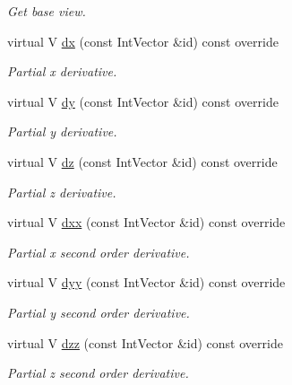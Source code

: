 \begin{DoxyCompactItemize}
\begin{DoxyCompactList}\small\item\em Get base view. \end{DoxyCompactList}\item 
virtual V \hyperlink{classUintah_1_1PhaseField_1_1detail_1_1dw__basic__fd__view_3_01ScalarField_3_01T_01_4_00_01STN_00_01VAR_01_4_ad93583d4b60ddc8eccb5199ddff534c3}{dx} (const Int\+Vector \&id) const override
\begin{DoxyCompactList}\small\item\em Partial x derivative. \end{DoxyCompactList}\item 
virtual V \hyperlink{classUintah_1_1PhaseField_1_1detail_1_1dw__basic__fd__view_3_01ScalarField_3_01T_01_4_00_01STN_00_01VAR_01_4_a99f11a208f062a1704d7ba83b0550591}{dy} (const Int\+Vector \&id) const override
\begin{DoxyCompactList}\small\item\em Partial y derivative. \end{DoxyCompactList}\item 
virtual V \hyperlink{classUintah_1_1PhaseField_1_1detail_1_1dw__basic__fd__view_3_01ScalarField_3_01T_01_4_00_01STN_00_01VAR_01_4_ab95f7f4aed23245ff58a676e9df745fb}{dz} (const Int\+Vector \&id) const override
\begin{DoxyCompactList}\small\item\em Partial z derivative. \end{DoxyCompactList}\item 
virtual V \hyperlink{classUintah_1_1PhaseField_1_1detail_1_1dw__basic__fd__view_3_01ScalarField_3_01T_01_4_00_01STN_00_01VAR_01_4_a3deb16fdbf624c192e273b7b856db9d2}{dxx} (const Int\+Vector \&id) const override
\begin{DoxyCompactList}\small\item\em Partial x second order derivative. \end{DoxyCompactList}\item 
virtual V \hyperlink{classUintah_1_1PhaseField_1_1detail_1_1dw__basic__fd__view_3_01ScalarField_3_01T_01_4_00_01STN_00_01VAR_01_4_ababac9886dc3c97a1cd3348e9f09d477}{dyy} (const Int\+Vector \&id) const override
\begin{DoxyCompactList}\small\item\em Partial y second order derivative. \end{DoxyCompactList}\item 
virtual V \hyperlink{classUintah_1_1PhaseField_1_1detail_1_1dw__basic__fd__view_3_01ScalarField_3_01T_01_4_00_01STN_00_01VAR_01_4_ad7be1669f58aaecc7f5e7ac94d087bc5}{dzz} (const Int\+Vector \&id) const override
\begin{DoxyCompactList}\small\item\em Partial z second order derivative. \end{DoxyCompactList}\end{DoxyCompactItemize}
